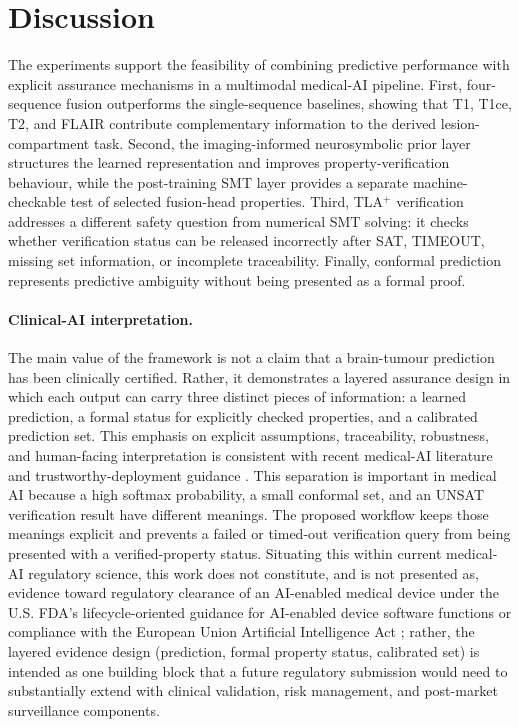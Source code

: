 \documentclass[preprint,11pt]{elsarticle}
\begin{document}
\section{Discussion}
\label{sec:discussion}

The experiments support the feasibility of combining predictive performance with explicit assurance mechanisms in a multimodal medical-AI pipeline. First, four-sequence fusion outperforms the single-sequence baselines, showing that T1, T1ce, T2, and FLAIR contribute complementary information to the derived lesion-compartment task. Second, the imaging-informed neurosymbolic prior layer structures the learned representation and improves property-verification behaviour, while the post-training SMT layer provides a separate machine-checkable test of selected fusion-head properties. Third, TLA$^{+}$ verification addresses a different safety question from numerical SMT solving: it checks whether verification status can be released incorrectly after SAT, TIMEOUT, missing set information, or incomplete traceability. Finally, conformal prediction represents predictive ambiguity without being presented as a formal proof.

\paragraph{Clinical-AI interpretation.}
The main value of the framework is not a claim that a brain-tumour prediction has been clinically certified. Rather, it demonstrates a layered assurance design in which each output can carry three distinct pieces of information: a learned prediction, a formal status for explicitly checked properties, and a calibrated prediction set. This emphasis on explicit assumptions, traceability, robustness, and human-facing interpretation is consistent with recent medical-AI literature and trustworthy-deployment guidance \cite{lekadir2025future,cicek2025position,andersen2026mapping}. This separation is important in medical AI because a high softmax probability, a small conformal set, and an UNSAT verification result have different meanings. The proposed workflow keeps those meanings explicit and prevents a failed or timed-out verification query from being presented with a verified-property status. Situating this within current medical-AI regulatory science, this work does not constitute, and is not presented as, evidence toward regulatory clearance of an AI-enabled medical device under the U.S. FDA's lifecycle-oriented guidance for AI-enabled device software functions or compliance with the European Union Artificial Intelligence Act \cite{fda2025aidsf,eu2024aiact}; rather, the layered evidence design (prediction, formal property status, calibrated set) is intended as one building block that a future regulatory submission would need to substantially extend with clinical validation, risk management, and post-market surveillance components.
\end{document}
